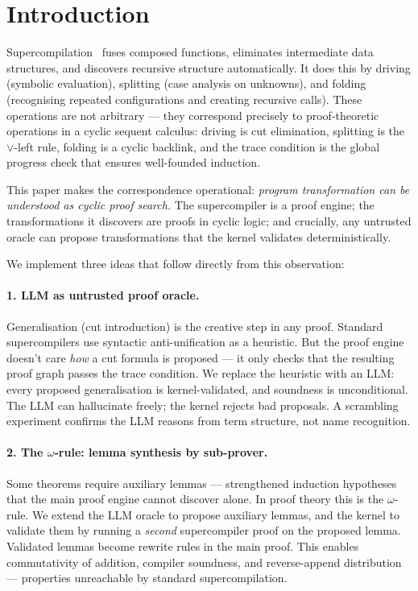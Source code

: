 \section{Introduction}
\label{sec:intro}

Supercompilation~\cite{turchin-1986-supercompiler} fuses composed functions,
eliminates intermediate data structures, and discovers recursive structure
automatically.  It does this by driving (symbolic evaluation), splitting
(case analysis on unknowns), and folding (recognising repeated configurations
and creating recursive calls).  These operations are not arbitrary --- they
correspond precisely to proof-theoretic operations in a cyclic sequent
calculus: driving is cut elimination, splitting is the $\vee$-left rule,
folding is a cyclic backlink, and the trace condition is the global progress
check that ensures well-founded induction.

This paper makes the correspondence operational: \emph{program transformation
can be understood as cyclic proof search.}  The supercompiler is a proof engine; the transformations
it discovers are proofs in cyclic logic; and crucially, any untrusted oracle
can propose transformations that the kernel validates deterministically.

We implement three ideas that follow directly from this observation:

\paragraph{1. LLM as untrusted proof oracle.}
Generalisation (cut introduction) is the creative step in any proof.  Standard
supercompilers use syntactic anti-unification as a heuristic.  But the proof
engine doesn't care \emph{how} a cut formula is proposed --- it only checks
that the resulting proof graph passes the trace condition.  We replace the
heuristic with an LLM: every proposed generalisation is kernel-validated, and
soundness is unconditional.  The LLM can hallucinate freely; the kernel rejects
bad proposals.  A scrambling experiment confirms the LLM reasons from term
structure, not name recognition.

\paragraph{2. The $\omega$-rule: lemma synthesis by sub-prover.}
Some theorems require auxiliary lemmas --- strengthened induction hypotheses
that the main proof engine cannot discover alone.  In proof theory this is
the $\omega$-rule.  We extend the LLM oracle to propose auxiliary lemmas, and
the kernel to validate them by running a \emph{second} supercompiler proof on
the proposed lemma.  Validated lemmas become rewrite rules in the main proof.
This enables commutativity of addition, compiler soundness, and reverse-append
distribution --- properties unreachable by standard supercompilation.

